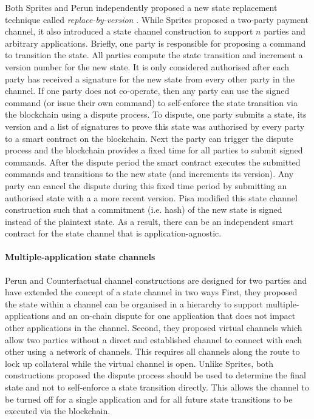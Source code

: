 \documentclass{llncs}
\begin{document}
Both Sprites  and Perun independently proposed a new state replacement technique called \textit{replace-by-version} \cite{miller2017sprites,dziembowski2017perun}. 
While Sprites proposed a two-party payment channel, it also introduced a state channel construction to support $n$ parties and arbitrary applications. 
Briefly, one party is responsible for proposing a command to transition the state.
All parties compute the state transition and increment a version number for the new state. 
It is only considered authorised after each party has received a signature for the new state from every other party in the channel. 
If one party does not co-operate, then any party can use the signed command (or issue their own command) to self-enforce the state transition via the blockchain using a dispute process. 
To dispute, one party submits a state, its version and a list of signatures to prove this state was authorised by every party to a smart contract on the blockchain. 
Next the party can trigger the dispute process and the blockchain provides a fixed time for all parties to submit signed commands. 
After the dispute period the smart contract executes the submitted commands and transitions to the new state (and increments its version).  
Any party can cancel the dispute during this fixed time period by submitting an authorised state with a a more recent version. 
Pisa modified this state channel construction such that a commitment (i.e. hash) of the new state is signed instead of the plaintext state. 
As a result, there can be an independent smart contract for the state channel that is application-agnostic. 

\paragraph{Multiple-application state channels} \label{sec:multiapp}
Perun and Counterfactual channel constructions are designed for two parties and have extended the concept of a state channel in two ways \cite{dziembowski2017perun,coleman2018counterfactual} 
First, they proposed the state within a channel can be organised in a hierarchy to support multiple-applications and an on-chain dispute for one application that does not impact other applications in the channel. 
Second, they proposed virtual channels which allow two parties without a direct and established channel to connect with each other using a network of channels. 
This requires all channels along the route to lock up collateral while the virtual channel is open. 
Unlike Sprites, both constructions proposed the dispute process should be used to determine the final state and not to self-enforce a state transition directly. 
This allows the channel to be turned off for a single application and for all future state transitions to be executed via the blockchain. 
\end{document}
